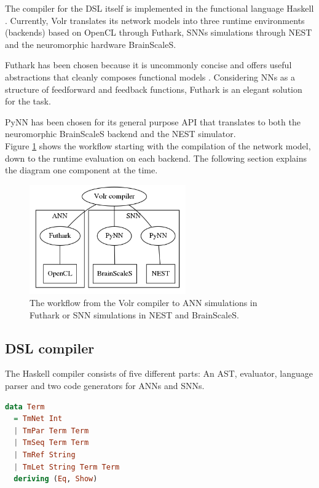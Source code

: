 The compiler for the \gls{DSL} itself is implemented in the functional language
Haskell \cite{Haskell}.
Currently, Volr translates its network models into three runtime
environments (backends) based on \gls{OpenCL} through Futhark,
\glspl{SNN} simulations through NEST and 
the neuromorphic hardware BrainScaleS.

Futhark has been chosen because it is uncommonly concise and offers
useful abstractions that cleanly composes functional
models \cite{Henriksen2017}.
Considering \gls{NN}s as a structure of feedforward and feedback functions,
Futhark is an elegant solution for the task.

PyNN has been chosen for its general purpose API that translates to both the
neuromorphic BrainScaleS  backend and the NEST 
 simulator.
\\[0.2cm]
Figure \ref{fig:volr-architecture} shows the workflow starting with the
compilation of the network model, down to the runtime evaluation on each backend.
The following section explains the diagram one component at the time.

\begin{figure}
  \centering
  \includegraphics[width=0.6\textwidth]{images/volr-architecture.png}
  \caption{The workflow from the Volr compiler to 
    \gls{ANN} simulations in Futhark or \gls{SNN} simulations in NEST and
    \gls{BrainScaleS}.
  }
  \label{fig:volr-architecture}
\end{figure}

\subsection{DSL compiler}
The Haskell compiler consists of five different parts:
An \gls{AST}, evaluator, language parser and two
code generators for \gls{ANN}s and \gls{SNN}s.

\lstset{mathescape=false,showstringspaces=false}
\begin{minipage}{\linewidth}
  \begin{lstlisting}[language=haskell, caption={The Volr AST in
  Haskell},label={code:term}]
data Term
  = TmNet Int 
  | TmPar Term Term
  | TmSeq Term Term
  | TmRef String
  | TmLet String Term Term
  deriving (Eq, Show)  
\end{lstlisting}
\end{minipage}

